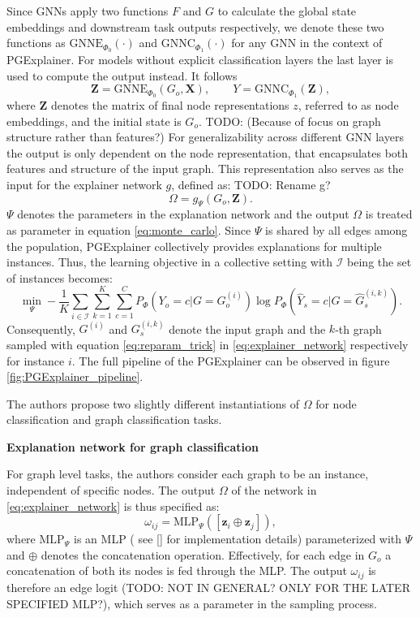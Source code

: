 Since GNNs apply two functions $F$ and $G$ to calculate the global state embeddings and downstream task outputs respectively, we denote these two functions as $\text{GNNE}_{\Phi_0}(\cdot)$ and $\text{GNNC}_{\Phi_1}(\cdot)$ for any GNN in the context of PGExplainer. For models without explicit classification layers the last layer is used to compute the output instead. It follows
\begin{equation}
    \mathbf{Z} = \text{GNNE}_{\Phi_0}(G_o, \mathbf{X}), \qquad Y = \text{GNNC}_{\Phi_1}(\mathbf{Z}),
\end{equation}
where $\mathbf{Z}$ denotes the matrix of final node representations $z$, referred to as node embeddings, and the initial state is $G_o$. TODO: (Because of focus on graph structure rather than features?) For generalizability across different GNN layers the output is only dependent on the node representation, that encapsulates both features and structure of the input graph. This representation also serves as the input for the explainer network $g$, defined as:
TODO: Rename g?
\begin{equation}
    \label{eq:explainer_network}
    \Omega = g_\Psi(G_o,\mathbf{Z}).
\end{equation}
$\Psi$ denotes the parameters in the explanation network and the output $\Omega$ is treated as parameter in equation \ref{eq:monte_carlo}. Since $\Psi$ is shared by all edges among the population, PGExplainer collectively provides explanations for multiple instances. Thus, the learning objective in a collective setting with $\mathcal{I}$ being the set of instances becomes:
\begin{equation}
    \min_\Psi -\frac{1}{K}\sum_{i\in \mathcal{I}}\sum_{k=1}^K\sum_{c=1}^C P_\Phi (Y_o = c|G = G_o^{(i)}) \log P_\Phi(\hat{Y}_s = c|G=\hat{G}_s^{(i,k)}).
\end{equation}
Consequently, $G^{(i)}$ and $G_s^{(i,k)}$ denote the input graph and the $k$-th graph sampled with equation \ref{eq:reparam_trick} in \ref{eq:explainer_network} respectively for instance $i$. The full pipeline of the PGExplainer can be observed in figure \ref{fig:PGExplainer_pipeline}. 

The authors propose two slightly different instantiations of $\Omega$ for node classification and graph classification tasks.

\textbf{Explanation network for graph classification}

For graph level tasks, the authors consider each graph to be an instance, independent  of specific nodes. The output $\Omega$ of the network in \ref{eq:explainer_network} is thus specified as:
\begin{equation}
    \label{eq:mlp_graph_input}
    \omega_{ij} = \text{MLP}_\Psi ([\mathbf{z}_i\oplus\mathbf{z}_j]),
\end{equation}
where $\text{MLP}_\Psi$ is an MLP ( see \ref{} for implementation details) parameterized with $\Psi$ and $\oplus$ denotes the concatenation operation. Effectively, for each edge in $G_o$ a concatenation of both its nodes is fed through the MLP. The output $\omega_{ij}$ is therefore an edge logit (TODO: NOT IN GENERAL? ONLY FOR THE LATER SPECIFIED MLP?), which serves as a parameter in the sampling process.

